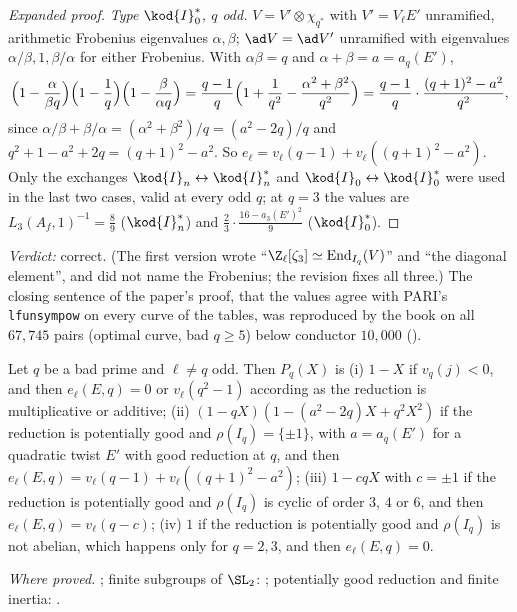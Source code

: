 \begin{sloppypar}
\begin{proof}[Expanded proof]
\emph{Type $\kod{I}_0^*$, $q$ odd.} $V=V'\otimes\chi_{q^*}$ with $V'=V_\ell E'$ unramified, arithmetic Frobenius eigenvalues $\alpha,\beta$; $\ad V=\ad V'$ unramified with eigenvalues
$\alpha/\beta,1,\beta/\alpha$ for either Frobenius. With $\alpha\beta=q$ and $\alpha+\beta=a=a_q(E')$,
\[
\Bigl(1-\frac{\alpha}{\beta q}\Bigr)\Bigl(1-\frac1q\Bigr)\Bigl(1-\frac{\beta}{\alpha q}\Bigr)=\frac{q-1}{q}\Bigl(1+\frac1{q^2}-\frac{\alpha^2+\beta^2}{q^2}\Bigr)=\frac{q-1}{q}\cdot\frac{(q+1)^2-a^2}{q^2},
\]
since $\alpha/\beta+\beta/\alpha=(\alpha^2+\beta^2)/q=(a^2-2q)/q$ and $q^2+1-a^2+2q=(q+1)^2-a^2$. So $e_\ell=v_\ell(q-1)+v_\ell((q+1)^2-a^2)$. Only the exchanges $\kod{I}_n\leftrightarrow\kod{I}_n^*$ and
$\kod{I}_0\leftrightarrow\kod{I}_0^*$ were used in the last two cases, valid at every odd $q$; at $q=3$ the values are $L_3(A_f,1)^{-1}=\frac89$ ($\kod{I}_n^*$) and $\frac23\cdot\frac{16-a_3(E')^2}9$ ($\kod{I}_0^*$).
\end{proof}

\noindent\emph{Verdict:} correct. (The first version wrote ``$\Z_\ell[\zeta_3]\simeq\operatorname{End}_{I_q}(V)$'' and ``the diagonal element'', and did not name the Frobenius; the
revision fixes all three.) The closing sentence of the paper's proof, that the values agree with PARI's \texttt{lfunsympow} on every curve of the tables, was
reproduced by the book on all $67{,}745$ pairs (optimal curve, bad $q\ge5$) below conductor $10{,}000$ ().

\begin{proposition}\label{prop:paper:shapes}
Let $q$ be a bad prime and $\ell\ne q$ odd. Then $P_q(X)$ is (i) $1-X$ if $v_q(j)<0$, and then $e_\ell(E,q)=0$ or $v_\ell(q^2-1)$ according as the reduction is multiplicative or
additive; (ii) $(1-qX)(1-(a^2-2q)X+q^2X^2)$ if the reduction is potentially good and $\rho(I_q)=\{\pm1\}$, with $a=a_q(E')$ for a quadratic twist $E'$ with good reduction at
$q$, and then $e_\ell(E,q)=v_\ell(q-1)+v_\ell((q+1)^2-a^2)$; (iii) $1-cqX$ with $c=\pm1$ if the reduction is potentially good and $\rho(I_q)$ is cyclic of order $3$, $4$ or $6$, and
then $e_\ell(E,q)=v_\ell(q-c)$; (iv) $1$ if the reduction is potentially good and $\rho(I_q)$ is not abelian, which happens only for $q=2,3$, and then $e_\ell(E,q)=0$.
\end{proposition}

\noindent\emph{Where proved.} ; finite subgroups of $\SL_2$: ; potentially good reduction and finite inertia: .


\end{sloppypar}

